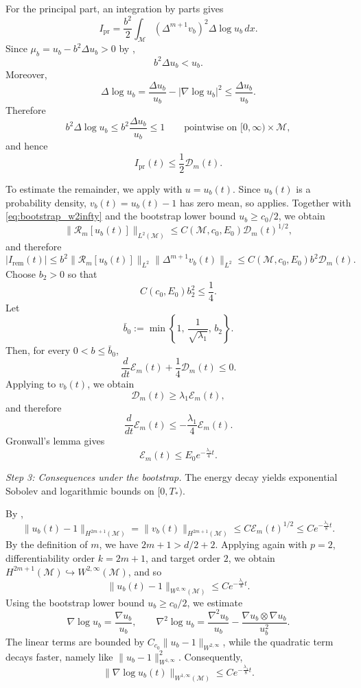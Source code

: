 \documentclass[11pt]{article}
\theoremstyle{definition}
\def\M{\mathcal M}
\begin{document}
For the principal part, an integration by parts gives 
\[
I_{\mathrm{pr}}
=
\frac{b^2}{2}
\int_{ \M}
(\Delta^{m+1} v_b)^2 \Delta \log u_b\, dx.
\]
Since $\mu_b = u_b - b^2 \Delta u_b > 0$ by ,
\[
b^2 \Delta u_b < u_b.
\]
Moreover,
\[
\Delta \log u_b
=
\frac{\Delta u_b}{u_b} - |\nabla \log u_b|^2
\le
\frac{\Delta u_b}{u_b}.
\]
Therefore
\[
b^2 \Delta \log u_b \le b^2\frac{\Delta u_b}{u_b} \le 1
\qquad
\text{pointwise on } [0,\infty)\times  \M,
\]
and hence
\[
I_{\mathrm{pr}}(t) \le \frac12 \mathcal D_m(t).
\]

To estimate the remainder, we apply  with
$u=u_b(t)$. Since $u_b(t)$ is a probability density, $v_b(t)=u_b(t)-1$ has zero
mean, so  applies. Together with
\eqref{eq:bootstrap_w2infty} and the bootstrap lower bound $u_b\ge c_0/2$, we obtain
\[
\|\mathcal R_m[u_b(t)]\|_{L^2( \M)}
\le
C( \M,c_0,E_0)\mathcal D_m(t)^{1/2},
\]
and therefore
\[
|I_{\mathrm{rem}}(t)|
\le
b^2 \|\mathcal R_m[u_b(t)]\|_{L^2}\|\Delta^{m+1}v_b(t)\|_{L^2}
\le
C( \M,c_0,E_0) b^2 \mathcal D_m(t).
\]
Choose $b_2>0$ so that
\[
C(c_0,E_0) b_2^2 \le \frac14.
\]
Let
\[
\bar b_0
:=
\min\left\{
1,\,
\frac{1}{\sqrt{ \lambda_1}},\,
b_2
\right\}.
\]
Then, for every $0 < b \le \bar b_0$,
\[
\frac{d}{dt}\mathcal E_m(t) + \frac14 \mathcal D_m(t) \le 0.
\]
Applying  to $v_b(t)$, we obtain
\[
\mathcal D_m(t) \ge  \lambda_1\mathcal E_m(t),
\]
and therefore
\[
\frac{d}{dt}\mathcal E_m(t)
\le
-\frac{ \lambda_1}{4}\mathcal E_m(t).
\]
Gronwall's lemma gives
\[
\mathcal E_m(t) \le E_0 e^{-\frac{ \lambda_1}{4}t}.
\]

\medskip
\noindent\emph{Step 3: Consequences under the bootstrap.} The energy decay yields exponential Sobolev and logarithmic bounds on $[0,T_\ast)$.

By ,
\[
\|u_b(t)-1\|_{H^{2m+1}( \M)}
=
\|v_b(t)\|_{H^{2m+1}( \M)}
\le
C \mathcal E_m(t)^{1/2}
\le
C e^{-\frac{ \lambda_1}{8}t}.
\]
By the definition of $m$, we have $2m+1 >  d/2 + 2$. Applying
\cite[Theorem~6.3]{hebey_robert_2008} again with $p=2$,
differentiability order $k=2m+1$, and target order $2$, we obtain
$H^{2m+1}( \M) \hookrightarrow W^{2,\infty}( \M)$, and so
\[
\|u_b(t)-1\|_{W^{2,\infty}( \M)}
\le
C e^{-\frac{ \lambda_1}{8}t}.
\]
Using the bootstrap lower bound $u_b\ge c_0/2$, we estimate
\[
\nabla \log u_b = \frac{\nabla u_b}{u_b},
\qquad
\nabla^2 \log u_b
=
\frac{\nabla^2 u_b}{u_b}
-
\frac{\nabla u_b \otimes \nabla u_b}{u_b^2}.
\]
The linear terms are bounded by $C_{c_0}\|u_b-1\|_{W^{2,\infty}}$, while the quadratic term decays faster, namely like $\|u_b-1\|_{W^{1,\infty}}^2$. Consequently,
\[
\|\nabla \log u_b(t)\|_{W^{1,\infty}( \M)}
\le
C e^{-\frac{ \lambda_1}{8}t}.
\]
\end{document}
